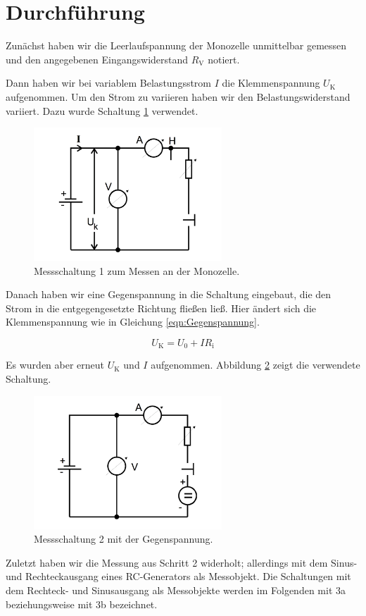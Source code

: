 \section{Durchführung}
\label{sec:Durchführung}

Zunächst haben wir die Leerlaufspannung der Monozelle unmittelbar gemessen und
den angegebenen Eingangswiderstand $R_\text{V}$ notiert.

Dann haben wir bei variablem Belastungsstrom $I$ die Klemmenspannung $U_\text{K}$
aufgenommen. Um den Strom zu variieren haben wir den Belastungswiderstand variiert.
Dazu wurde Schaltung \ref{fig:Schaltung1} verwendet.

\begin{figure}[h]
  \centering
  \includegraphics[height = 5cm]{Abbildung 1.pdf}
  \caption{Messschaltung 1 zum Messen an der Monozelle.}
  \label{fig:Schaltung1}
\end{figure}

Danach haben wir eine Gegenspannung in die Schaltung eingebaut, die den Strom
in die entgegengesetzte Richtung fließen ließ. Hier ändert sich die Klemmenspannung
wie in Gleichung \eqref{eqn:Gegenspannung}.

\begin{equation}
  U_\text{K} = U_\text{0} + IR_\text{i}
  \label{eqn:Gegenspannung}
\end{equation}

Es wurden aber erneut $U_\text{K}$ und $I$ aufgenommen. Abbildung \ref{fig:Schaltung2}
zeigt die verwendete Schaltung.

\begin{figure}[h]
  \centering
  \includegraphics[height = 5cm]{Abbildung 2.pdf}
  \caption{Messschaltung 2 mit der Gegenspannung.}
  \label{fig:Schaltung2}
\end{figure}

Zuletzt haben wir die Messung aus Schritt 2 widerholt; allerdings mit dem Sinus-
und Rechteckausgang eines RC-Generators als Messobjekt.
Die Schaltungen mit dem Rechteck- und Sinusausgang als Messobjekte werden im
Folgenden mit 3a beziehungsweise mit 3b bezeichnet.

